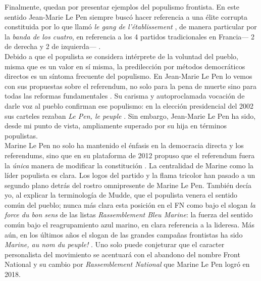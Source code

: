 Finalmente, quedan por presentar ejemplos del populismo frontista. En este sentido Jean-Marie Le Pen siempre buscó hacer referencia a una élite corrupta constituida por lo que llamó \textit{le gang de l'établissement} \parencite{Leprince16}, de manera particular por la \textit{banda de los cuatro}, en referencia a los 4 partidos tradicionales en Francia--- 2 de derecha y 2 de izquierda--- \parencite{Boily05}.\\ 

Debido a que el populista se considera intérprete de la voluntad del pueblo, misma que es un valor en sí misma, la predilección por métodos democráticos directos es un síntoma frecuente del populismo. En Jean-Marie Le Pen lo vemos con sus propuestas sobre el referendum, no solo para la pena de muerte sino para todas las reformas fundamentales \parencite{LObs07}. Su carisma y autoproclamada vocación de darle voz al pueblo confirman ese populismo: en la elección presidencial del 2002 sus carteles rezaban \textit{Le Pen, le peuple} \parencite{Gross16}. Sin embargo, Jean-Marie Le Pen ha sido, desde mi punto de vista, ampliamente superado por su hija en términos populistas.\\ 

Marine Le Pen no solo ha mantenido el énfasis en la democracia directa y los referendums, sino que en su plataforma de 2012 propuso que el referendum fuera la \textit{única} manera de modificar la constitución \parencite[énfasis mío]{LePen12}. La centralidad de Marine como la líder populista es clara. Los logos del partido y la flama tricolor han pasado a un segundo plano detrás del rostro omnipresente de Marine Le Pen. También decía yo, al explicar la terminología de Mudde, que el populista venera el sentido común del pueblo; nunca más clara esta posición en el FN como bajo el slogan \textit{la force du bon sens} de las listas \textit{Rassemblement Bleu Marine}: la fuerza del sentido común bajo el reagrupamiento azul marino, en clara referencia a la lideresa. Más aún, en los últimos años el slogan de las grandes campañas frontistas ha sido \textit{Marine, au nom du peuple!} \parencite{Gross16}. Uno solo puede conjeturar que el caracter personalista del movimiento se acentuará con el abandono del nombre Front National y su cambio por \textit{Rassemblement National} que Marine Le Pen logró en 2018.